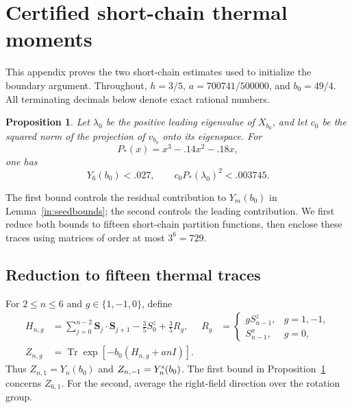 \documentclass[11pt]{article}
\newtheorem{proposition}[theorem]{Proposition}
\theoremstyle{remark}
\numberwithin{equation}{section}
\begin{document}
\appendix
\section{Certified short-chain thermal moments}\label{app:thermal}

This appendix proves the two short-chain estimates used to initialize the
boundary argument. Throughout, $h=3/5$, $a=700741/500000$, and $b_0=49/4$.
All terminating decimals below denote exact rational numbers.

\begin{proposition}\label{appth:bounds}
Let $\lambda_0$ be the positive leading eigenvalue of $X_{b_0}$, and let
$c_0$ be the squared norm of the projection of $v_{b_0}$ onto its eigenspace.
For
\[
 P_*(x)=x^3-.14x^2-.18x,
\]
one has
\begin{equation}\label{appth:conclusions}
 Y_6(b_0)<.027,
 \qquad c_0P_*(\lambda_0)^2<.003745.
\end{equation}
\end{proposition}

The first bound controls the residual contribution to $Y_m(b_0)$ in
Lemma~\ref{in:seedbounds}; the second controls the leading contribution.
We first reduce both bounds to fifteen short-chain partition functions,
then enclose these traces using matrices of order at most $3^6=729$.

\subsection{Reduction to fifteen thermal traces}

For $2\le n\le6$ and $g\in\{1,-1,0\}$, define
\begin{align}
 H_{n,g}
 &=\sum_{j=0}^{n-2}\mathbf S_j\mathbin\cdot\mathbf S_{j+1}
       -\frac35S_0^z+\frac35R_g,
 &
 R_g&=
 \begin{cases}
    gS_{n-1}^z,&g=1,-1,\\
    S_{n-1}^x,&g=0,
 \end{cases}
 \label{appth:H}\\
 Z_{n,g}&=\operatorname{Tr}\exp[-b_0(H_{n,g}+an I)].\nonumber
\end{align}
Thus $Z_{n,1}=Y_n(b_0)$ and $Z_{n,-1}=Y_n^{\rm s}(b_0)$.
The first bound in Proposition~\ref{appth:bounds} concerns $Z_{6,1}$.
For the second, average the right-field direction over the rotation group.
\end{document}
